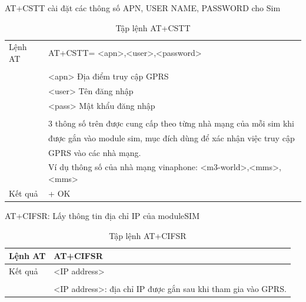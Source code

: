 AT+CSTT cài đặt các thông số APN, USER NAME, PASSWORD cho Sim
\begin{table}[H]
\label{table:at+cstt}
\begin{tabular}{|l|l|}
\hline
Lệnh AT & AT+CSTT= <apn>,<user>,<password> \\ 
& \\
& \hspace{0.5cm}<apn> Địa điểm truy cập GPRS\\
& \hspace{0.5cm}<user> Tên đăng nhập\\
& \hspace{0.5cm}<pass> Mật khẩu đăng nhập\\
& \\
& 3 thông số trên được cung cấp theo từng nhà mạng của mỗi sim khi \\
& được gắn vào module sim, mục đích dùng để xác nhận việc truy cập \\
& GPRS vào các nhà mạng.\\
& Ví dụ thông số của nhà mạng vinaphone: <m3-world>,<mms>,<mms> \\\hline
Kết quả  &+ OK \\\hline
\end{tabular}

\caption[Tập lệnh AT+CSTT: cài đặt các thông số APN, USER NAME, PASSWORD cho Sim]{Tập lệnh AT+CSTT}
\end{table}





AT+CIFSR: Lấy thông tin địa chỉ IP của moduleSIM
\begin{table}[H]
\label{table:AT+CIFS}
\begin{tabular}{|l|l|}
\hline
Lệnh AT & AT+CIFSR \\ \hline
Kết quả  & 
<IP address> \\
& \\
& <IP address>: địa chỉ IP được gắn sau khi tham gia vào GPRS.\\\hline
\end{tabular}

\caption[Tập lệnh AT+CIFSR: lấy thông tin địa chỉ IP của moduleSIM]{Tập lệnh AT+CIFSR}
\end{table}




